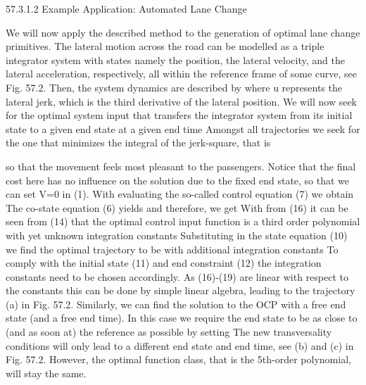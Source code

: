 57.3.1.2	Example Application: Automated Lane Change

We will now apply the described method to the generation of optimal lane change primitives. The lateral motion across the road can be modelled as a triple integrator system with states 
namely the position, the lateral velocity, and the lateral acceleration, respectively, all within the reference frame of some curve, see Fig. 57.2.
Then, the system dynamics are described by 
where u represents the lateral jerk, which is the third derivative of the lateral position. We will now seek for the optimal system input %
that transfers the integrator system from its initial state
 to a given end state 
at a given end time 
Amongst all trajectories we seek for the one that minimizes the integral of the jerk-square, that is

so that the movement feels most pleasant to the passengers. Notice that the final cost here has no influence on the solution due to the fixed end state, so that we can set V=0 in (1).
With 
evaluating the so-called control equation (7) we obtain
The co-state equation (6) yields
and therefore, we get
With 
from (16) it can be seen from (14) that the optimal control input function is a third order polynomial with yet unknown integration constants 
Substituting 
in the state equation (10) we find the optimal trajectory to be
with additional integration constants %
To comply with the initial state (11) and end constraint (12) the integration constants need to be chosen accordingly. As (16)-(19) are linear with respect to the constants this can be done by simple linear algebra, leading to the trajectory (a) in Fig. 57.2. 
Similarly, we can find the solution to the OCP with a free end state (and a free end time). In this case we require the end state to be as close to (and as soon at) the reference as possible by setting
The new transversality conditions will only lead to a different end state and end time, see (b) and (c) in Fig. 57.2. However, the optimal function class, that is the 5th-order polynomial, will stay the same.

